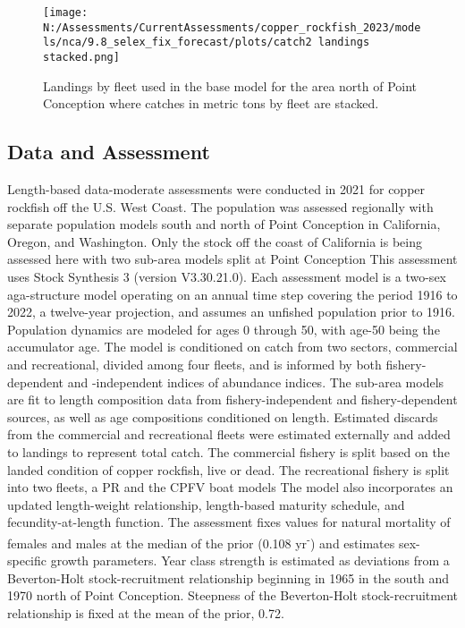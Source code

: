 \documentclass[11pt,
  english,
  letterpaper,
]{article}
\begin{document}
\begin{figure}
\centering
\texttt{[image: N:/Assessments/CurrentAssessments/copper\_rockfish\_2023/models/nca/9.8\_selex\_fix\_forecast/plots/catch2 landings stacked.png]}
\caption{Landings by fleet used in the base model for the area north of Point Conception where catches in metric tons by fleet are stacked.\label{fig:es-north-catch}}
\end{figure}

\pagebreak

\hypertarget{data-and-assessment}{%
\subsection*{Data and Assessment}\label{data-and-assessment}}

Length-based data-moderate assessments were conducted in 2021 for copper rockfish off the U.S. West Coast. The population was assessed regionally with separate population models south and north of Point Conception in California, Oregon, and Washington. Only the stock off the coast of California is being assessed here with two sub-area models split at Point Conception This assessment uses Stock Synthesis 3 (version V3.30.21.0). Each assessment model is a two-sex aga-structure model operating on an annual time step covering the period 1916 to 2022, a twelve-year projection, and assumes an unfished population prior to 1916. Population dynamics are modeled for ages 0 through 50, with age-50 being the accumulator age. The model is conditioned on catch from two sectors, commercial and recreational, divided among four fleets, and is informed by both fishery-dependent and -independent indices of abundance indices. The sub-area models are fit to length composition data from fishery-independent and fishery-dependent sources, as well as age compositions conditioned on length. Estimated discards from the commercial and recreational fleets were estimated externally and added to landings to represent total catch. The commercial fishery is split based on the landed condition of copper rockfish, live or dead. The recreational fishery is split into two fleets, a PR and the CPFV boat models The model also incorporates an updated length-weight relationship, length-based maturity schedule, and fecundity-at-length function. The assessment fixes values for natural mortality of females and males at the median of the prior (0.108 yr\textsuperscript{-}) and estimates sex-specific growth parameters. Year class strength is estimated as deviations from a Beverton-Holt stock-recruitment relationship beginning in 1965 in the south and 1970 north of Point Conception. Steepness of the Beverton-Holt stock-recruitment relationship is fixed at the mean of the prior, 0.72.
\end{document}
